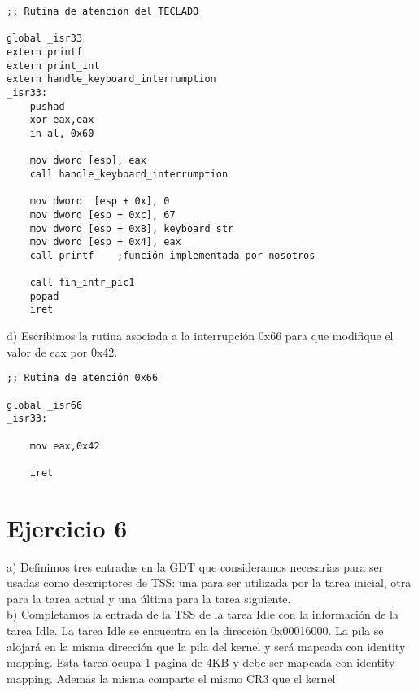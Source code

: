 \documentclass[a4paper]{article}
\begin{document}
\begin{codesnippet}
\begin{verbatim}
;; Rutina de atención del TECLADO

global _isr33
extern printf
extern print_int
extern handle_keyboard_interrumption
_isr33:
    pushad
    xor eax,eax
    in al, 0x60

    mov dword [esp], eax
    call handle_keyboard_interrumption
    
    mov dword  [esp + 0x], 0
    mov dword [esp + 0xc], 67
    mov dword [esp + 0x8], keyboard_str
    mov dword [esp + 0x4], eax
    call printf    ;función implementada por nosotros

    call fin_intr_pic1
    popad
    iret
\end{verbatim}
\end{codesnippet}


{\large d)} Escribimos la rutina asociada a la interrupci\'on 0x66 para que modifique el valor de eax por
0x42. 
\begin{codesnippet}
\begin{verbatim}
;; Rutina de atención 0x66

global _isr66
_isr33:

    mov eax,0x42
  
    iret
\end{verbatim}
\end{codesnippet}

\newpage
\section{Ejercicio 6}
{\large a)} Definimos tres entradas en la GDT que consideramos necesarias para ser usadas como descriptores
de TSS: una para ser utilizada por la tarea inicial, otra para la tarea actual y una \'ultima para la tarea siguiente.\\

{\large b)} Completamos la entrada de la TSS de la tarea Idle con la informaci\'on de la tarea Idle. La tarea Idle se encuentra en la direcci\'on 0x00016000. La pila se alojar\'a en la misma direcci\'on que la pila del kernel y ser\'a mapeada
con identity mapping. Esta tarea ocupa 1 pagina de 4KB y debe ser mapeada con identity mapping. Adem\'as la misma comparte el mismo CR3 que el kernel. \\
\end{document}
